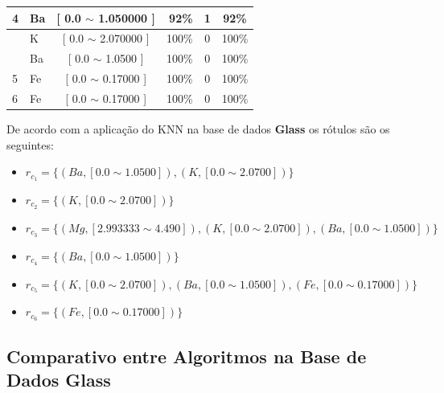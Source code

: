 \begin{table}[!h]
{\begin{tabular}{llcrcc}
4                                           & Ba    & [ 0.0 $\sim$ 1.050000    ]       & 92\%                               & 1 &  92\%\\  \hline                                            
                                            & K     & [ 0.0 $\sim$  2.070000     ]       & 100\%                               & 0 & 100\%\\  
                                            & Ba    & [ 0.0 $\sim$  1.0500     ]       & 100\%                               & 0 & 100\% \\   
\multirow{-3}{*}{5}                         & Fe    & [ 0.0 $\sim$  0.17000     ]       & 100\%                               & 0 & 100\% \\  \hline
6                                           & Fe    & [ 0.0 $\sim$  0.17000     ]       & 100\%                               & 0 & 100\% \\  \hline

\hline

\end{tabular}
}
\end{table}

De acordo com a aplicação do KNN na base de dados \textbf{Glass} os rótulos são os seguintes:
\begin{itemize}[noitemsep]
 \item ${r_{c_1}=\{ (Ba,[ 0.0 \sim 1.0500 ] ), (K,[ 0.0 \sim  2.0700 ] )\} }$
 \item ${r_{c_2}=\{(K,[ 0.0 \sim  2.0700 ] ) \} }$
 \item ${r_{c_3}=\{ (Mg, [ 2.993333 \sim  4.490]), (K,[ 0.0 \sim  2.0700 ] ), (Ba,[ 0.0 \sim 1.0500 ] )  \} }$  
 \item ${r_{c_4}=\{ (Ba,[ 0.0 \sim 1.0500 ] ) \}}$
 \item ${r_{c_5}=\{ (K,[ 0.0 \sim  2.0700 ] ), (Ba,[ 0.0 \sim 1.0500 ] ), (Fe,[ 0.0 \sim 0.17000] ) \} }$
 \item ${r_{c_6}=\{ (Fe,[ 0.0 \sim 0.17000] ) \} }$
\end{itemize}


\subsection{Comparativo entre Algoritmos na Base de Dados Glass} \label{cap:resultados:ssec:compalgoritmos:glass}

